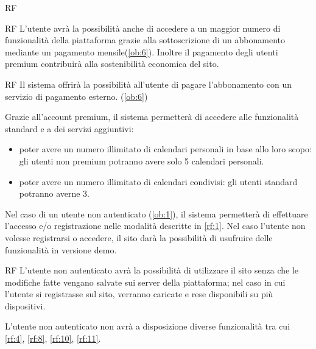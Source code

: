 \begin{listaPersonale}{RF}
\begin{listaPersonale2}{RF}
		 L'utente avrà la possibilità anche di accedere a un maggior numero di funzionalità della piattaforma grazie alla sottoscrizione di un abbonamento mediante un pagamento mensile(\ref{ob:6}). Inoltre il pagamento degli utenti premium contribuirà alla sostenibilità economica del sito.

		\begin{listaPersonale3}{RF}
			 Il sistema offrirà la possibilità all'utente di pagare l'abbonamento con un servizio di pagamento esterno. (\ref{ob:6})

			 Grazie all'account premium, il sistema permetterà di accedere alle funzionalità standard e a dei servizi aggiuntivi:
			\begin{itemize}
				\item poter avere un numero illimitato di calendari personali in base allo loro scopo: gli utenti non premium potranno avere solo 5 calendari personali.
				\item poter avere un numero illimitato di calendari condivisi: gli utenti standard potranno averne 3.
			\end{itemize}

		\end{listaPersonale3}
	\end{listaPersonale2}

	 Nel caso di un utente non autenticato (\ref{ob:1}), il sistema permetterà di effettuare l'accesso e/o registrazione nelle modalità descritte in \ref{rf:1}. Nel caso l'utente non volesse registrarsi o accedere, il sito darà la possibilità di usufruire delle funzionalità in versione demo.

	\begin{listaPersonale2}{RF}
			L'utente non autenticato avrà la possibilità di utilizzare il sito senza che le modifiche fatte vengano salvate sui server della piattaforma; nel caso in cui l'utente si registrasse sul sito, verranno caricate e rese disponibili su più dispositivi.

		\begin{listaPersonale3}{}
			 L'utente non autenticato non avrà a disposizione diverse funzionalità tra cui \ref{rf:4}, \ref{rf:8}, \ref{rf:10}, \ref{rf:11}.
		\end{listaPersonale3}
	\end{listaPersonale2}


\end{listaPersonale}
